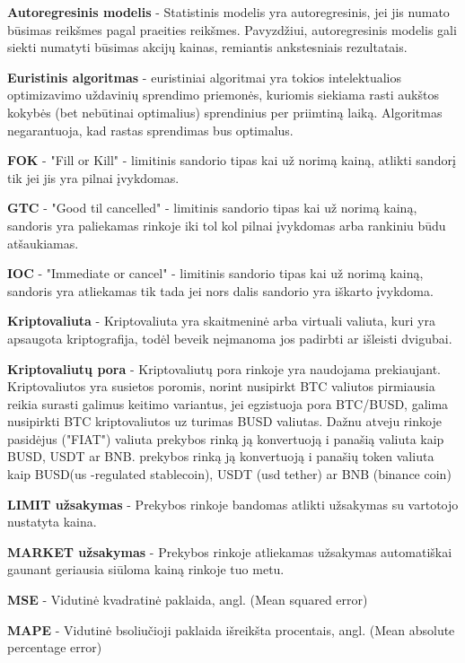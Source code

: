 \documentclass{VUMIFInfKursinis}
\begin{document}
\textbf{Autoregresinis modelis} - Statistinis modelis yra autoregresinis, jei jis numato būsimas reikšmes pagal praeities reikšmes. Pavyzdžiui, autoregresinis modelis gali
siekti numatyti būsimas akcijų kainas, remiantis ankstesniais rezultatais.

\textbf{Euristinis algoritmas} - euristiniai algoritmai yra tokios intelektualios optimizavimo uždavinių sprendimo priemonės, kuriomis siekiama rasti aukštos
kokybės (bet nebūtinai optimalius) sprendinius per priimtiną laiką. Algoritmas negarantuoja, kad rastas sprendimas bus optimalus. \cite{misevivcius2009euristiniku}

\textbf{FOK} - "Fill or Kill" - limitinis sandorio tipas kai už norimą kainą, atlikti sandorį tik jei jis yra pilnai įvykdomas.

\textbf{GTC} - "Good til cancelled" - limitinis sandorio tipas kai už norimą kainą, sandoris yra paliekamas rinkoje iki tol kol pilnai įvykdomas arba rankiniu būdu atšaukiamas.

\textbf{IOC} - "Immediate or cancel" - limitinis sandorio tipas kai už norimą kainą, sandoris yra atliekamas tik tada jei nors dalis sandorio yra iškarto įvykdoma.

\textbf{Kriptovaliuta} - Kriptovaliuta yra skaitmeninė arba virtuali valiuta, kuri yra apsaugota kriptografija, todėl beveik neįmanoma jos padirbti ar išleisti dvigubai.

\textbf{Kriptovaliutų pora} - Kriptovaliutų pora rinkoje yra naudojama prekiaujant. Kriptovaliutos yra susietos poromis, norint nusipirkt BTC valiutos pirmiausia reikia surasti 
galimus keitimo variantus, jei egzistuoja pora BTC/BUSD, galima nusipirkti BTC kriptovaliutos uz turimas BUSD valiutas. Dažnu atveju rinkoje pasidėjus ("FIAT") valiuta
prekybos rinką ją konvertuoją i panašią valiuta kaip BUSD, USDT ar BNB.
prekybos rinką ją konvertuoją i panašių token valiuta kaip BUSD(us -regulated stablecoin), USDT (usd tether) ar BNB (binance coin)

\textbf{LIMIT užsakymas} - Prekybos rinkoje bandomas atlikti užsakymas su vartotojo nustatyta kaina.

\textbf{MARKET užsakymas} - Prekybos rinkoje atliekamas užsakymas automatiškai gaunant geriausia siūloma kainą rinkoje tuo metu.

\textbf{MSE} - Vidutinė kvadratinė paklaida, angl. (Mean squared error)

\textbf{MAPE} - Vidutinė  bsoliučioji paklaida išreikšta procentais, angl. (Mean absolute percentage error)

\printbibliography[heading=bibintoc] %

\appendix  %
\end{document}
